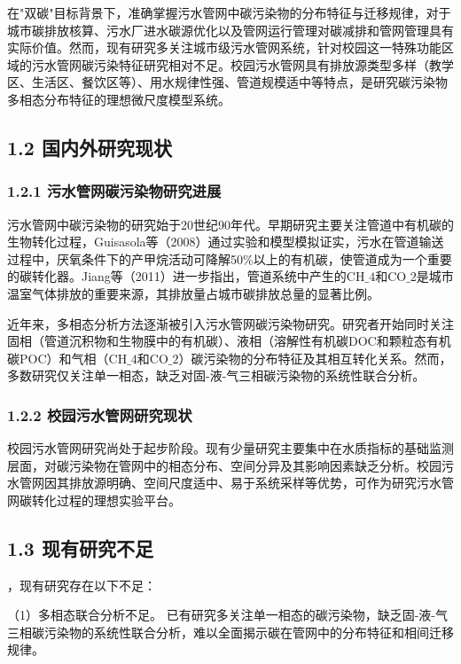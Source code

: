 \documentclass[12pt]{article}
\begin{document}
在"双碳"目标背景下，准确掌握污水管网中碳污染物的分布特征与迁移规律，对于城市碳排放核算、污水厂进水碳源优化以及管网运行管理对碳减排和管网管理具有实际价值。然而，现有研究多关注城市级污水管网系统，针对校园这一特殊功能区域的污水管网碳污染特征研究相对不足。校园污水管网具有排放源类型多样（教学区、生活区、餐饮区等）、用水规律性强、管道规模适中等特点，是研究碳污染物多相态分布特征的理想微尺度模型系统。

\subsection{1.2 国内外研究现状}

\subsubsection{1.2.1 污水管网碳污染物研究进展}

污水管网中碳污染物的研究始于20世纪90年代。早期研究主要关注管道中有机碳的生物转化过程，Guisasola等（2008）通过实验和模型模拟证实，污水在管道输送过程中，厌氧条件下的产甲烷活动可降解50\%以上的有机碳，使管道成为一个重要的碳转化器。Jiang等（2011）进一步指出，管道系统中产生的CH$\_4$和CO$\_2$是城市温室气体排放的重要来源，其排放量占城市碳排放总量的显著比例。

近年来，多相态分析方法逐渐被引入污水管网碳污染物研究。研究者开始同时关注固相（管道沉积物和生物膜中的有机碳）、液相（溶解性有机碳DOC和颗粒态有机碳POC）和气相（CH$\_4$和CO$\_2$）碳污染物的分布特征及其相互转化关系。然而，多数研究仅关注单一相态，缺乏对固-液-气三相碳污染物的系统性联合分析。

\subsubsection{1.2.2 校园污水管网研究现状}

校园污水管网研究尚处于起步阶段。现有少量研究主要集中在水质指标的基础监测层面，对碳污染物在管网中的相态分布、空间分异及其影响因素缺乏分析。校园污水管网因其排放源明确、空间尺度适中、易于系统采样等优势，可作为研究污水管网碳转化过程的理想实验平台。

\subsection{1.3 现有研究不足}

，现有研究存在以下不足：

（1）多相态联合分析不足。 已有研究多关注单一相态的碳污染物，缺乏固-液-气三相碳污染物的系统性联合分析，难以全面揭示碳在管网中的分布特征和相间迁移规律。
\end{document}
